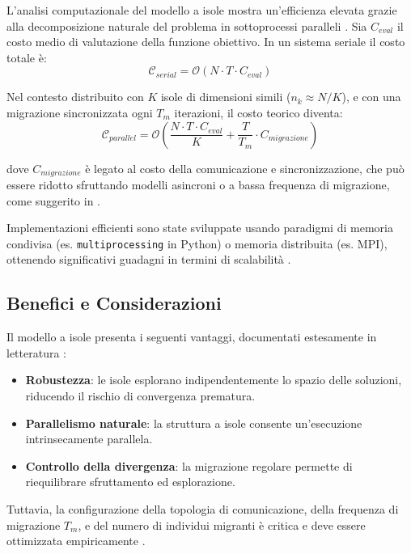 \documentclass{article}
\begin{document}
L'analisi computazionale del modello a isole mostra un'efficienza elevata grazie alla decomposizione 
naturale del problema in sottoprocessi paralleli \cite{alba2005parallel}. Sia $C_{eval}$ il costo medio 
di valutazione della funzione obiettivo. In un sistema seriale il costo totale è:
\[
\mathcal{C}_{serial} = \mathcal{O}(N \cdot T \cdot C_{eval})
\]

Nel contesto distribuito con $K$ isole di dimensioni simili ($n_k \approx N/K$), e con una migrazione 
sincronizzata ogni $T_m$ iterazioni, il costo teorico diventa:
\[
\mathcal{C}_{parallel} = \mathcal{O}\left(\frac{N \cdot T \cdot C_{eval}}{K} + \frac{T}{T_m} \cdot C_{migrazione}\right)
\]

dove $C_{migrazione}$ è legato al costo della comunicazione e sincronizzazione, che può essere ridotto 
sfruttando modelli asincroni o a bassa frequenza di migrazione, come suggerito in \cite{cantupaz1998survey}.

Implementazioni efficienti sono state sviluppate usando paradigmi di memoria condivisa 
(es. \texttt{multiprocessing} in Python) o memoria distribuita (es. MPI), ottenendo significativi guadagni in 
termini di scalabilità \cite{alba2002parallelism, li2019openbox}.

\subsection{Benefici e Considerazioni}

Il modello a isole presenta i seguenti vantaggi, documentati estesamente in letteratura \cite{cantupaz1998survey, tomassini2005spatially}:

\begin{itemize}
    \item \textbf{Robustezza}: le isole esplorano indipendentemente lo spazio delle soluzioni, riducendo il rischio di convergenza prematura.
    \item \textbf{Parallelismo naturale}: la struttura a isole consente un'esecuzione intrinsecamente parallela.
    \item \textbf{Controllo della divergenza}: la migrazione regolare permette di riequilibrare sfruttamento ed esplorazione.
\end{itemize}

Tuttavia, la configurazione della topologia di comunicazione, della frequenza di migrazione $T_m$, e del 
numero di individui migranti è critica e deve essere ottimizzata empiricamente \cite{alba2002parallelism}.
\end{document}
